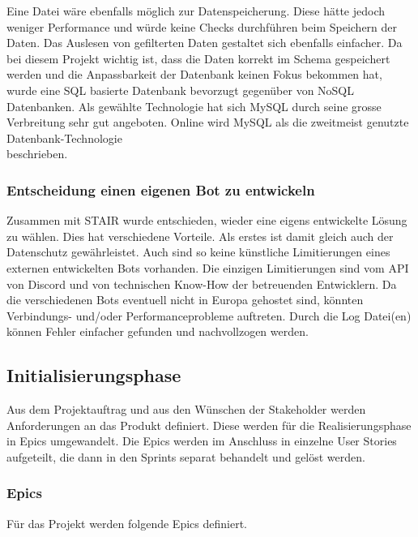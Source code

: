\documentclass[a4paper, table]{article}
\begin{document}
Eine Datei wäre ebenfalls möglich zur Datenspeicherung.
Diese hätte jedoch weniger Performance und würde keine Checks durchführen beim Speichern der Daten.
Das Auslesen von gefilterten Daten gestaltet sich ebenfalls einfacher.\autocite{castro_why_2020}
Da bei diesem Projekt wichtig ist, dass die Daten korrekt im Schema gespeichert werden und die Anpassbarkeit der Datenbank keinen Fokus bekommen hat, wurde eine SQL basierte Datenbank bevorzugt gegenüber von NoSQL Datenbanken.
Als gewählte Technologie hat sich MySQL durch seine grosse Verbreitung sehr gut angeboten.
Online wird MySQL als die zweitmeist genutzte Datenbank-Technologie\\beschrieben.\autocite{noauthor_db-engines_2022}

\subsubsection*{Entscheidung einen eigenen Bot zu entwickeln}
Zusammen mit STAIR wurde entschieden, wieder eine eigens entwickelte Lösung zu wählen.
Dies hat verschiedene Vorteile.
Als erstes ist damit gleich auch der Datenschutz gewährleistet.
Auch sind so keine künstliche Limitierungen eines externen entwickelten Bots vorhanden.
Die einzigen Limitierungen sind vom API von Discord und von technischen Know-How der betreuenden Entwicklern.
Da die verschiedenen Bots eventuell nicht in Europa gehostet sind, könnten Verbindungs- und/oder Performanceprobleme auftreten.
Durch die Log Datei(en) können Fehler einfacher gefunden und nachvollzogen werden.
\newpage
\subsection{Initialisierungsphase}
Aus dem Projektauftrag und aus den Wünschen der Stakeholder werden Anforderungen an das Produkt definiert.
Diese werden für die Realisierungsphase in Epics umgewandelt.
Die Epics werden im Anschluss in einzelne User Stories aufgeteilt, die dann in den Sprints separat behandelt und gelöst werden.

\subsubsection{Epics}\label{Epics}
Für das Projekt werden folgende Epics definiert.
\end{document}
